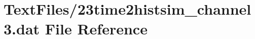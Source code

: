 \hypertarget{23time2histsim__channel3_8dat}{}\section{Text\+Files/23time2histsim\+\_\+channel3.dat File Reference}
\label{23time2histsim__channel3_8dat}
